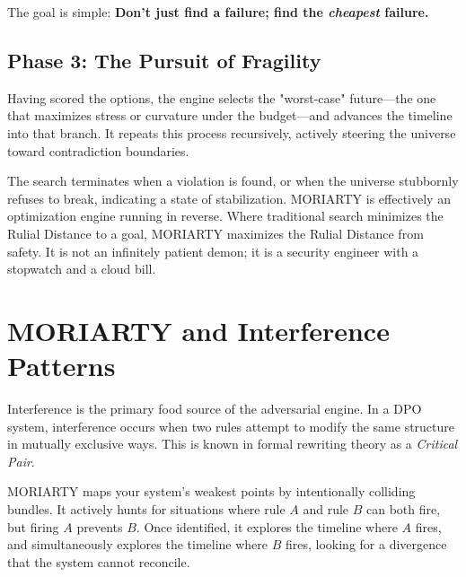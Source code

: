 The goal is simple: \textbf{Don’t just find a failure; find the \emph{cheapest} failure.}

\subsection*{Phase 3: The Pursuit of Fragility}

Having scored the options, the engine selects the "worst-case" future—the one that maximizes stress or curvature under the budget—and advances the timeline into that branch. It repeats this process recursively, actively steering the universe toward contradiction boundaries.

The search terminates when a violation is found, or when the universe stubbornly refuses to break, indicating a state of stabilization. MORIARTY is effectively an optimization engine running in reverse. Where traditional search minimizes the Rulial Distance to a goal, MORIARTY maximizes the Rulial Distance from safety. It is not an infinitely patient demon; it is a security engineer with a stopwatch and a cloud bill.

\section{MORIARTY and Interference Patterns}

Interference is the primary food source of the adversarial engine. In a DPO system, interference occurs when two rules attempt to modify the same structure in mutually exclusive ways. This is known in formal rewriting theory as a \emph{Critical Pair}.

MORIARTY maps your system's weakest points by intentionally colliding bundles. It actively hunts for situations where rule $A$ and rule $B$ can both fire, but firing $A$ prevents $B$. Once identified, it explores the timeline where $A$ fires, and simultaneously explores the timeline where $B$ fires, looking for a divergence that the system cannot reconcile.


